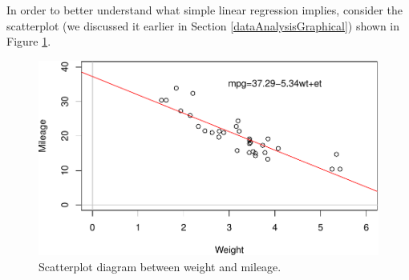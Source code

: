 \documentclass[
]{book}
\newenvironment{Shaded}{\begin{snugshade}}{\end{snugshade}}
\newcommand{\AttributeTok}[1]{\textcolor[rgb]{0.77,0.63,0.00}{#1}}
\newcommand{\DecValTok}[1]{\textcolor[rgb]{0.00,0.00,0.81}{#1}}
\newcommand{\FunctionTok}[1]{\textcolor[rgb]{0.00,0.00,0.00}{#1}}
\newcommand{\NormalTok}[1]{#1}
\newcommand{\OtherTok}[1]{\textcolor[rgb]{0.56,0.35,0.01}{#1}}
\newcommand{\SpecialCharTok}[1]{\textcolor[rgb]{0.00,0.00,0.00}{#1}}
\newcommand{\StringTok}[1]{\textcolor[rgb]{0.31,0.60,0.02}{#1}}
\theoremstyle{definition}
\theoremstyle{definition}
\theoremstyle{definition}
\theoremstyle{definition}
\theoremstyle{remark}
\begin{document}
In order to better understand what simple linear regression implies, consider the scatterplot (we discussed it earlier in Section \ref{dataAnalysisGraphical}) shown in Figure \ref{fig:scatterWeightMPG2}.

\begin{Shaded}
\end{Shaded}

\begin{figure}
\centering
\includegraphics{Svetunkov---Statistics-for-Business-Analytics_files/figure-latex/scatterWeightMPG2-1.pdf}
\caption{\label{fig:scatterWeightMPG2}Scatterplot diagram between weight and mileage.}
\end{figure}
\end{document}
